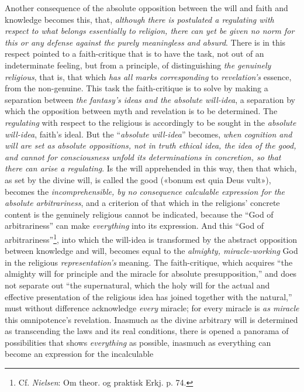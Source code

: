 \documentclass[12pt,a4paper]{book}
\begin{document}
Another consequence of the absolute opposition between the will and faith and knowledge becomes this,
that, \emph{although there is postulated a regulating with respect to what belongs essentially to
religion, there can yet be given no norm for this or any defense against the purely meaningless and
absurd}. There is in this respect pointed to a faith-critique that is to have the task, not out of an
indeterminate feeling, but from a principle, of distinguishing \emph{the genuinely religious}, that is,
that which \emph{has all marks corresponding} to \emph{revelation's} essence, from the non-genuine. This task the
faith-critique is to solve by making a separation between \emph{the fantasy's ideas and the absolute
will-idea}, a separation by which the opposition between myth and revelation is to be determined. The
\emph{regulating} with respect to the religious is accordingly to be sought in the \emph{absolute will-idea},
faith's ideal. But the ``\emph{absolute will-idea}'' becomes, \emph{when cognition and will are set as absolute
oppositions, not in truth ethical idea, the idea of the good, and cannot for consciousness unfold its
determinations in concretion, so that there can arise a regulating}. Is the will apprehended in this way,
then that which, as set by the divine will, is called the good («bonum est quia Deus vult»), becomes the
\emph{incomprehensible, by no consequence calculable expression for the absolute arbitrariness}, and a
criterion of that which in the religions' concrete content is the genuinely religious cannot be indicated,
because the ``God of arbitrariness'' can make \emph{everything} into its expression. And this ``God of
arbitrariness''\footnote{Cf. \emph{Nielsen}: Om theor. og praktisk Erkj. p. 74.}, into which the will-idea is
transformed by the abstract opposition between knowledge and will, becomes equal to the \emph{almighty,
miracle-working} God in the religious \emph{representation's} meaning. The faith-critique, which acquires ``the
almighty will for principle and the miracle for absolute presupposition,'' and does not separate out ``the
supernatural, which the holy will for the actual and effective presentation of the religious idea has
joined together with the natural,'' must without difference acknowledge \emph{every} miracle; for every
miracle is \emph{as miracle} this omnipotence's revelation. Inasmuch as the divine arbitrary will is
determined as transcending the laws and its real conditions, there is opened a panorama of possibilities
that shows \emph{everything} as possible, inasmuch as everything can become an expression for the incalculable
\end{document}
